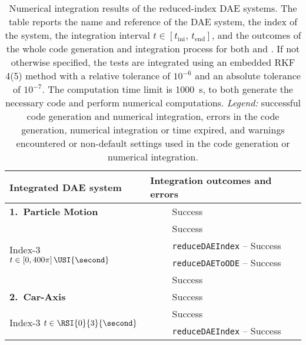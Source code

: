 {\setlength\tabcolsep{0.1em}
\setlength{\LTcapwidth}{\textwidth}
\footnotesize\centering\begin{longtable}{lccl}
  \caption{Numerical integration results of the reduced-index \ac{DAE} systems. The table reports the name and reference of the \ac{DAE} system, the index of the system, the integration interval $t \in [t_{\text{ini}}, \, t_{\text{end}}]$, and the outcomes of the whole code generation and integration process for both \Maple{} and \Indigo{}. If not otherwise specified, the tests are integrated using an embedded \ac{RKF} 4(5) method with a relative tolerance of $10^{-6}$ and an absolute tolerance of $10^{-7}$. The computation time limit is \SI{1000}{\second}, to both generate the necessary code and perform numerical computations. \emph{Legend:} \mycheckmark{} successful code generation and numerical integration, \mycrossmark{} errors in the code generation, numerical integration or time expired, and \mywarnmark{} warnings encountered or non-default settings used in the code generation or numerical integration.}
  \label{chap5:tab:numerical_integration}
  \endfirsthead
  \endhead
  \toprule
  \textbf{Integrated \ac{DAE} system} &
  \multicolumn{3}{l}{\textbf{Integration outcomes and errors}} \\
  \midrule
  \multirow{1}{*}{\textbf{1.~Particle Motion}} %
    & \Maple{}       & \mycheckmark{}\phantom{\mywarnmark{}} & Success \\ \cmidrule{2-4}
    \multirow{4}{*}{Index-3 \quad $t \in [0, 400\pi]\,\USI{\second}$} & \Mathematica{} & \mycheckmark{}\phantom{\mywarnmark{}} & Success \\ \cmidrule{2-4}
    & \multirow{2}{*}{\Matlab{}} & \mycheckmark{}\phantom{\mywarnmark{}} & \texttt{reduceDAEIndex} -- Success \\ \cmidrule{3-4}
    &                            & \mycheckmark{}\phantom{\mywarnmark{}} & \texttt{reduceDAEToODE} -- Success \\ \cmidrule{2-4}\cmidrule{2-4}
    & \Indigo{} & \mycheckmark{}\phantom{\mywarnmark{}} & Success \\ \midrule
  \multirow{1}{*}{\textbf{2.~Car-Axis}} %
    & \Maple{}       & \mycheckmark{}\phantom{\mywarnmark{}} & Success \\ \cmidrule{2-4}
    \multirow{4}{*}{Index-3 \quad $t \in \RSI{0}{3}{\second}$} & \Mathematica{} & \mycheckmark{}\phantom{\mywarnmark{}} & Success \\ \cmidrule{2-4}
    & \multirow{2}{*}{\Matlab{}} & \mycheckmark{}\phantom{\mywarnmark{}} & \texttt{reduceDAEIndex} -- Success \\ \cmidrule{3-4}

\end{longtable}}

